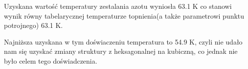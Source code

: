 \documentclass{article}
\begin{document}
Uzyskana wartość temperatury zestalania azotu wyniosła 63.1 K co stanowi wynik równy tabelarycznej temperaturze topnienia(a także parametrowi punktu potrojnego) 63.1 K.

Najniższa uzyskana w tym doświaczeniu temperatura to 54.9 K, czyli nie udało nam się uzyskać zmiany struktury z heksagonalnej na kubiczną, co jednak nie było celem tego doświadczenia.






\end{document}
